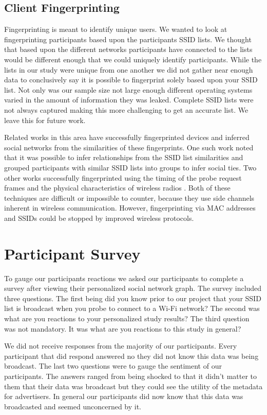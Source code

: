 \documentclass[letterpaper,twocolumn,10pt]{article}
\begin{document}
\subsection{Client Fingerprinting}

Fingerprinting is meant to identify unique users. We wanted to look at fingerprinting participants based upon the participants SSID lists. We thought that based upon the different networks participants have connected to the lists would be different enough that we could uniquely identify participants. While the lists in our study were unique from one another we did not gather near enough data to conclusively say it is possible to fingerprint solely based upon your SSID list. Not only was our sample size not large enough different operating systems varied in the amount of information they was leaked. Complete SSID lists were not always captured making this more challenging to get an accurate list. We leave this for future work.

Related works in this area have successfully fingerprinted devices and inferred social networks from the similarities of these fingerprints. One such work noted that it was possible to infer relationships from the SSID list similarities and grouped participants with similar SSID lists into groups to infer social ties\cite{cunche}. Two other works successfully fingerprinted using the timing of the probe request frames \cite{desmond} and the physical characteristics of wireless radios \cite{ureten}. Both of these techniques are difficult or impossible to counter, because they use side channels inherent in wireless communication. However, fingerprinting via MAC addresses and SSIDs could be stopped by improved wireless protocols.


\section{Participant Survey}


To gauge our participants reactions we asked our participants to complete a survey after viewing their personalized social network graph. The survey included three questions. The first being did you know prior to our project that your SSID list is broadcast when you probe to connect to a Wi-Fi network? The second was what are you reactions to your personalized study results? The third question was not mandatory. It was what are you reactions to this study in general?

 We did not receive responses from the majority of our participants. Every participant that did respond answered no they did not know this data was being broadcast. The last two questions were to gauge the sentiment of our participants. The answers ranged from being shocked to that it didn't matter to them that their data was broadcast but they could see the utility of the metadata for advertisers. In general our participants did now know that this data was broadcasted and seemed unconcerned by it.
\end{document}
